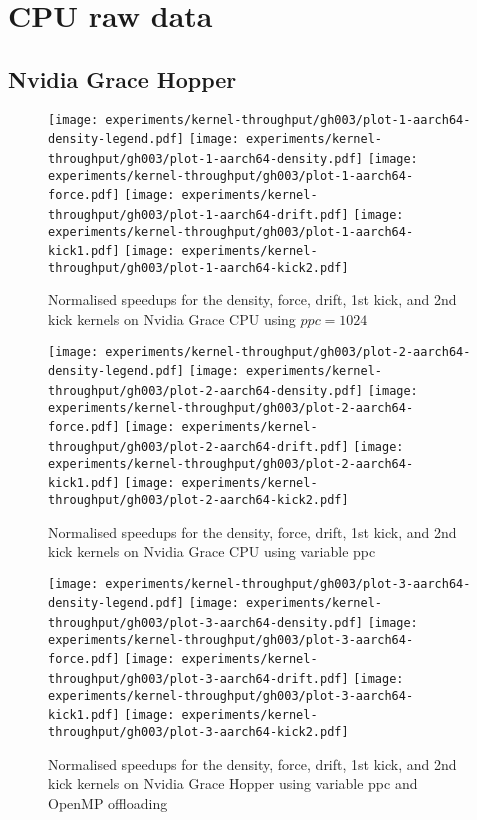 \section{CPU raw data}

\subsection{Nvidia Grace Hopper}

\begin{figure}[H]
\centering
 \texttt{[image: experiments/kernel-throughput/gh003/plot-1-aarch64-density-legend.pdf]}
 \texttt{[image: experiments/kernel-throughput/gh003/plot-1-aarch64-density.pdf]}
 \texttt{[image: experiments/kernel-throughput/gh003/plot-1-aarch64-force.pdf]}
 \texttt{[image: experiments/kernel-throughput/gh003/plot-1-aarch64-drift.pdf]}
 \texttt{[image: experiments/kernel-throughput/gh003/plot-1-aarch64-kick1.pdf]}
 \texttt{[image: experiments/kernel-throughput/gh003/plot-1-aarch64-kick2.pdf]}
\caption{Normalised speedups for the density, force, drift, 1st kick, and 2nd kick kernels on Nvidia Grace CPU using $ppc=1024$}
\end{figure}

\begin{figure}[H]
\centering
 \texttt{[image: experiments/kernel-throughput/gh003/plot-2-aarch64-density-legend.pdf]}
 \texttt{[image: experiments/kernel-throughput/gh003/plot-2-aarch64-density.pdf]}
 \texttt{[image: experiments/kernel-throughput/gh003/plot-2-aarch64-force.pdf]}
 \texttt{[image: experiments/kernel-throughput/gh003/plot-2-aarch64-drift.pdf]}
 \texttt{[image: experiments/kernel-throughput/gh003/plot-2-aarch64-kick1.pdf]}
 \texttt{[image: experiments/kernel-throughput/gh003/plot-2-aarch64-kick2.pdf]}
\caption{Normalised speedups for the density, force, drift, 1st kick, and 2nd kick kernels on Nvidia Grace CPU using variable ppc}
\end{figure}

\begin{figure}[H]
\centering
 \texttt{[image: experiments/kernel-throughput/gh003/plot-3-aarch64-density-legend.pdf]}
 \texttt{[image: experiments/kernel-throughput/gh003/plot-3-aarch64-density.pdf]}
 \texttt{[image: experiments/kernel-throughput/gh003/plot-3-aarch64-force.pdf]}
 \texttt{[image: experiments/kernel-throughput/gh003/plot-3-aarch64-drift.pdf]}
 \texttt{[image: experiments/kernel-throughput/gh003/plot-3-aarch64-kick1.pdf]}
 \texttt{[image: experiments/kernel-throughput/gh003/plot-3-aarch64-kick2.pdf]}
\caption{Normalised speedups for the density, force, drift, 1st kick, and 2nd kick kernels on Nvidia Grace Hopper using variable ppc and OpenMP offloading}
\end{figure}

